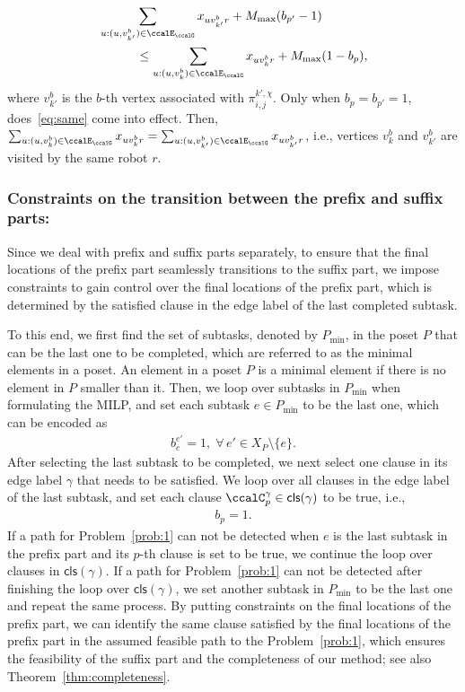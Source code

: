 \documentclass[Afour,sageh,times]{sagej}
\newcommand{\clause}[1]{\mathsf{cls}(#1)}
\newcommand{\aap}[4]{\mathcal{\pi}_{{#1},{#2}}^{#3,#4}}
\begin{document}
{{{{\begin{subequations}
\begin{align}
    & \sum_{u:(u, v_{k'}^b) \in \ccalE_\ccalG} x_{u v_{k'}^b r} + M_{\text{max}} (b_{p'} - 1) \nonumber \\& \quad\quad\quad \leq \sum_{u:(u, v_{k}^b) \in \ccalE_\ccalG} x_{u v_{k}^b r} + M_{\text{max}}(1 - b_{p}),
  \end{align}
\end{subequations}
\endgroup
where $v_{k'}^b$ is the $b$-th vertex associated with $\aap{i}{j}{k'}{\chi}$. Only when $b_p = b_{p'}=1$, does~\eqref{eq:same} come into effect. Then, $\sum\nolimits_{u:(u, v_k^b) \in \ccalE_\ccalG} x_{u v_k^b r} = \sum\nolimits_{u:(u, v_{k'}^b) \in \ccalE_\ccalG} x_{u v_{k'}^b r} $, i.e., vertices $v_k^b$ and $v_{k'}^b$ are visited by the same robot $r$.

\subsubsection{Constraints on the transition between the prefix and suffix parts:}\label{sec:transition} Since we deal with prefix and suffix parts separately, to ensure that the final locations of the prefix part seamlessly transitions to the suffix part, we impose constraints to gain control over  the final locations of the prefix part, which is determined by the satisfied clause in the edge label of the last completed subtask.

To this end,  we first find the set of subtasks, denoted by $P_{\text{min}}$, in the poset $P$ that can be the last one to be completed, which are referred to as the minimal elements in a poset. An element in a poset $P$  is a minimal element if there is no element in $P$ smaller than it. Then, we loop over subtasks in $P_{\text{min}}$ when formulating the MILP, and set each subtask $e\in P_{\text{min}}$ to be the last one, which can be encoded as
\begin{align}\label{eq:lastsubtask0}
  b_e^{e'} = 1, \;  \forall\, e' \in X_P \setminus\{e\}.
\end{align}
After selecting the last subtask to be completed, we next select one clause in its edge label $\gamma$ that needs to be satisfied. We loop over all clauses in the edge label of the last subtask, and set each clause $\ccalC_p^\gamma \in \clause{\gamma}$ to be true, i.e.,
\begin{align}\label{eq:lastclause}
  b_p = 1.
\end{align}
If a path for Problem~\ref{prob:1} can not be detected when  $e$ is the last subtask in the prefix part  and its $p$-th clause is set to be true,  we continue the loop over clauses in $\clause{\gamma}$. If a path for Problem~\ref{prob:1} can not be detected after finishing the loop over $\clause{\gamma}$, we set another subtask in $P_{\text{min}}$ to be the last one and repeat the same process. By putting constraints on the final locations of the prefix part, we can identify the same clause satisfied by the final locations of the prefix part in the assumed feasible path to the Problem~\ref{prob:1}, which ensures the feasibility of  the suffix part and the completeness of our method; see also Theorem~\ref{thm:completeness}.


}}}}
\end{document}
